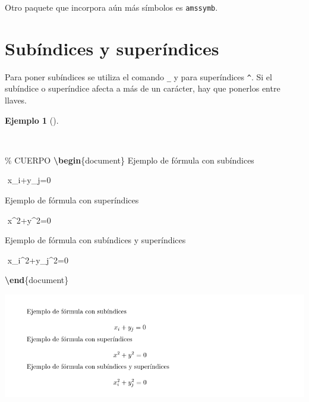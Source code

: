 \documentclass[
  a4paper,
]{scrreport}
\newenvironment{Shaded}{\begin{snugshade}}{\end{snugshade}}
\newcommand{\CommentTok}[1]{\textcolor[rgb]{0.37,0.37,0.37}{#1}}
\newcommand{\ExtensionTok}[1]{\textcolor[rgb]{0.00,0.23,0.31}{#1}}
\newcommand{\KeywordTok}[1]{\textcolor[rgb]{0.00,0.23,0.31}{\textbf{#1}}}
\newcommand{\NormalTok}[1]{\textcolor[rgb]{0.00,0.23,0.31}{#1}}
\newcommand{\SpecialStringTok}[1]{\textcolor[rgb]{0.13,0.47,0.30}{#1}}
\theoremstyle{definition}
\newtheorem{example}{Ejemplo}[chapter]
\theoremstyle{remark}
\begin{document}
Otro paquete que incorpora aún más símbolos es \texttt{amssymb}.

\section{Subíndices y
superíndices}\label{subuxedndices-y-superuxedndices}

Para poner subíndices se utiliza el comando \texttt{\_} y para
superíndices \texttt{\^{}}. Si el subíndice o superíndice afecta a más
de un carácter, hay que ponerlos entre llaves.

\begin{example}[]\protect\hypertarget{exm-subindices-superindices}{}\label{exm-subindices-superindices}

~

\begin{Shaded}
\begin{Highlighting}[]
\CommentTok{\% CUERPO}
\KeywordTok{\textbackslash{}begin}\NormalTok{\{}\ExtensionTok{document}\NormalTok{\}}
\NormalTok{Ejemplo de fórmula con subíndices}

\SpecialStringTok{$$ }
\SpecialStringTok{x\_i+y\_j=0}
\SpecialStringTok{$$}

\NormalTok{Ejemplo de fórmula con superíndices}

\SpecialStringTok{$$ }
\SpecialStringTok{x\^{}2+y\^{}2=0}
\SpecialStringTok{$$}

\NormalTok{Ejemplo de fórmula con subíndices y superíndices}

\SpecialStringTok{$$ }
\SpecialStringTok{x\_i\^{}2+y\_j\^{}2=0}
\SpecialStringTok{$$}

\KeywordTok{\textbackslash{}end}\NormalTok{\{}\ExtensionTok{document}\NormalTok{\}}
\end{Highlighting}
\end{Shaded}

\begin{tcolorbox}[enhanced jigsaw, colframe=quarto-callout-note-color-frame, opacityback=0, title={Salida}, bottomrule=.15mm, left=2mm, coltitle=black, arc=.35mm, leftrule=.75mm, colback=white, rightrule=.15mm, colbacktitle=quarto-callout-note-color!10!white, toprule=.15mm, breakable, opacitybacktitle=0.6, bottomtitle=1mm, toptitle=1mm, titlerule=0mm]

\includegraphics{img/formulas/indices.png}

\end{tcolorbox}

\end{example}
\end{document}
